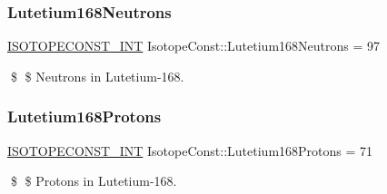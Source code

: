 \subsubsection{\texorpdfstring{Lutetium168\+Neutrons}{Lutetium168Neutrons}}
{\footnotesize\ttfamily \mbox{\hyperlink{group___isotope_const-_macros_ga5f18360b3e99483a35c32d789e62621c}{I\+S\+O\+T\+O\+P\+E\+C\+O\+N\+S\+T\+\_\+\+I\+NT}} Isotope\+Const\+::\+Lutetium168\+Neutrons = 97}

\$ \$ Neutrons in Lutetium-\/168. \mbox{\label{group___isotope_const-_lutetium-_lu168_ga9b1b89adfacb9fbb220e4636fd9f280b}} 
\subsubsection{\texorpdfstring{Lutetium168\+Protons}{Lutetium168Protons}}
{\footnotesize\ttfamily \mbox{\hyperlink{group___isotope_const-_macros_ga5f18360b3e99483a35c32d789e62621c}{I\+S\+O\+T\+O\+P\+E\+C\+O\+N\+S\+T\+\_\+\+I\+NT}} Isotope\+Const\+::\+Lutetium168\+Protons = 71}

\$ \$ Protons in Lutetium-\/168. 